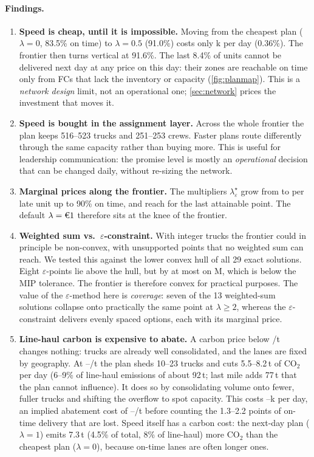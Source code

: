 \paragraph{Findings.}
\begin{enumerate}
  \item \textbf{Speed is cheap, until it is impossible.} Moving from the cheapest plan ($\lambda=0$, 83.5\% on time) to $\lambda=0.5$ (91.0\%) costs only k per day (0.36\%). The frontier then turns vertical at 91.6\%. The last 8.4\% of units cannot be delivered next day at any price on this day: their zones are reachable on time only from FCs that lack the inventory or capacity (\cref{fig:planmap}). This is a \emph{network design} limit, not an operational one; \cref{sec:network} prices the investment that moves it.
  \item \textbf{Speed is bought in the assignment layer.} Across the whole frontier the plan keeps 516--523 trucks and 251--253 crews. Faster plans route differently through the same capacity rather than buying more. This is useful for leadership communication: the promise level is mostly an \emph{operational} decision that can be changed daily, without re-sizing the network.
  \item \textbf{Marginal prices along the frontier.} The multipliers $\lambda^\star_\varepsilon$ grow from  to  per late unit up to 90\% on time, and reach  for the last attainable point. The default $\lambda=\EUR{1}$ therefore sits at the knee of the frontier.
  \item \textbf{Weighted sum vs.\ $\varepsilon$-constraint.} With integer trucks the frontier could in principle be non-convex, with unsupported points that no weighted sum can reach. We tested this against the lower convex hull of all 29 exact solutions. Eight $\varepsilon$-points lie above the hull, but by at most  on M, which is below the MIP tolerance. The frontier is therefore convex for practical purposes. The value of the $\varepsilon$-method here is \emph{coverage}: seven of the 13 weighted-sum solutions collapse onto practically the same point at $\lambda\ge 2$, whereas the $\varepsilon$-constraint delivers evenly spaced options, each with its marginal price.
  \item \textbf{Line-haul carbon is expensive to abate.} A carbon price below /t changes nothing: trucks are already well consolidated, and the lanes are fixed by geography. At --/t the plan sheds 10--23 trucks and cuts 5.5--8.2\,t of CO$_2$ per day (6--9\% of line-haul emissions of about 92\,t; last mile adds 77\,t that the plan cannot influence). It does so by consolidating volume onto fewer, fuller trucks and shifting the overflow to spot capacity. This costs --k per day, an implied abatement cost of --/t before counting the 1.3--2.2 points of on-time delivery that are lost. Speed itself has a carbon cost: the next-day plan ($\lambda=1$) emits 7.3\,t (4.5\% of total, 8\% of line-haul) more CO$_2$ than the cheapest plan ($\lambda=0$), because on-time lanes are often longer ones.
\end{enumerate}
